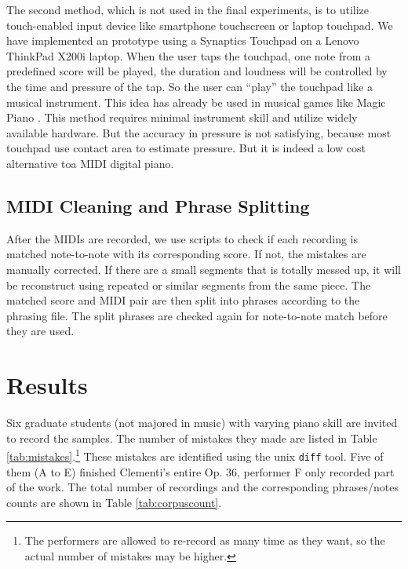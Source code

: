 The second method, which is not used in the final experiments, is to utilize touch-enabled input device like smartphone touchscreen or laptop touchpad. We have implemented an prototype using a Synaptics Touchpad on a Lenovo ThinkPad X200i laptop. When the user taps the touchpad, one note from a predefined score will be played, the duration and loudness will be controlled by the time and pressure of the tap. So the user can \enquote{play} the touchpad like a musical instrument. This idea has already be used in musical games like Magic Piano \cite{magicpiano}. This method requires minimal instrument skill and utilize widely available hardware. But the accuracy in pressure is not satisfying, because most touchpad use contact area to estimate pressure. But it is indeed a low cost alternative toa MIDI digital piano.

\subsection{MIDI Cleaning and Phrase Splitting}
  After the MIDIs are recorded, we use scripts to check if each recording is matched note-to-note with its corresponding score. If not, the mistakes are manually corrected. %
  If there are a small segments that is totally messed up, it will be reconstruct using repeated or similar segments from the same piece. The matched score and MIDI pair are then split into phrases according to the phrasing file. The split phrases are checked again for note-to-note match before they are used.

\section{Results}
Six graduate students (not majored in music) with varying piano skill are invited to record the samples. The number of mistakes they made are listed in Table \ref{tab:mistakes}.\footnote{The performers are allowed to re-record as many time as they want, so the actual number of mistakes may be higher.} These mistakes are identified using the unix \texttt{diff}\cite{diff} tool. Five of them (A to E) finished Clementi's entire Op. 36, performer F only recorded part of the work. The total number of recordings and the corresponding phrases/notes counts are shown in Table \ref{tab:corpuscount}. 

